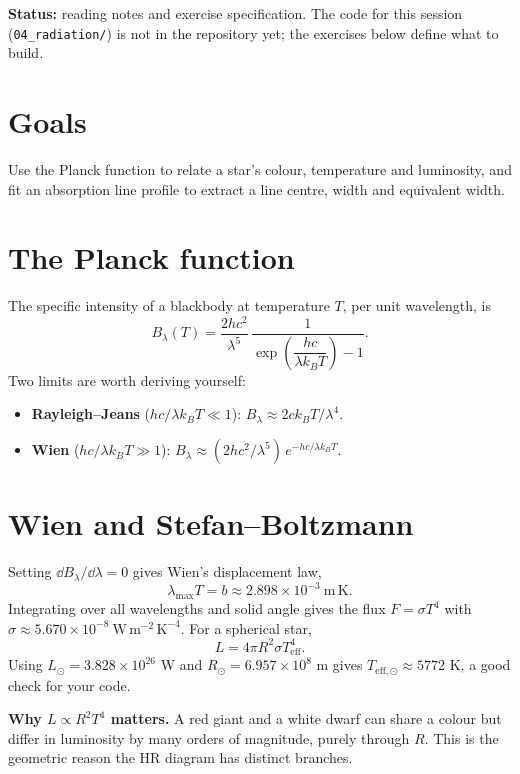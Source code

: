 


\textbf{Status:} reading notes and exercise specification. The code for this session (\texttt{04\_radiation/}) is not in the repository yet; the exercises below define what to build.

\section*{Goals}
Use the Planck function to relate a star's colour, temperature and luminosity, and fit an absorption line profile to extract a line centre, width and equivalent width.

\section{The Planck function}
The specific intensity of a blackbody at temperature $T$, per unit wavelength, is
\[
B_\lambda(T) = \frac{2hc^2}{\lambda^5}\,\frac{1}{\exp\!\left(\dfrac{hc}{\lambda k_BT}\right)-1}.
\]
Two limits are worth deriving yourself:
\begin{itemize}
\item \textbf{Rayleigh--Jeans} ($hc/\lambda k_BT\ll1$): $B_\lambda\approx 2ck_BT/\lambda^4$.
\item \textbf{Wien} ($hc/\lambda k_BT\gg1$): $B_\lambda\approx (2hc^2/\lambda^5)\,e^{-hc/\lambda k_BT}$.
\end{itemize}

\section{Wien and Stefan--Boltzmann}
Setting $\dd B_\lambda/\dd\lambda=0$ gives Wien's displacement law,
\[
\lambda_{\max}T = b \approx 2.898\times10^{-3}\ \mathrm{m\,K}.
\]
Integrating over all wavelengths and solid angle gives the flux $F=\sigma T^4$ with $\sigma\approx5.670\times10^{-8}\ \mathrm{W\,m^{-2}\,K^{-4}}$. For a spherical star,
\[
L = 4\pi R^2\sigma T_{\mathrm{eff}}^4 .
\]
Using $L_\odot=3.828\times10^{26}$ W and $R_\odot=6.957\times10^{8}$ m gives $T_{\mathrm{eff},\odot}\approx 5772$ K, a good check for your code.

\begin{keyidea}
\textbf{Why $L\propto R^2T^4$ matters.} A red giant and a white dwarf can share a colour but differ in luminosity by many orders of magnitude, purely through $R$. This is the geometric reason the HR diagram has distinct branches.
\end{keyidea}

